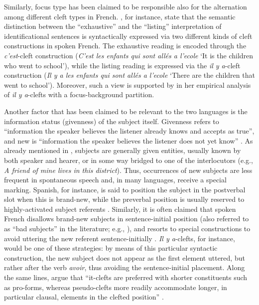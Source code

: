 Similarly, focus type has been claimed to be responsible also for the alternation among different cleft types in French. \textcite{de2015status}, for instance, state that the semantic distinction between the ``exhaustive” and the ``listing” interpretation of identificational sentences is syntactically expressed via two different kinds of cleft constructions in spoken French. The exhaustive reading is encoded through the \textit{c’est}-cleft construction (\textit{C’est les enfants qui sont allés a l’ecole} `It is the children who went to school'), while the listing reading is expressed via the \textit{il y a}-cleft construction (\textit{Il y a les enfants qui sont allés a l’ecole} `There  are  the  children  that went to school'). Moreover, such a view is supported by \textcite{karssenberg2017oiseaux} in her empirical analysis of \textit{il y a}-clefts with a focus-background partition.

Another factor that has been claimed to be relevant to the two languages is the information status (givenness) \parencite{firbas1966non, chafe1970meaning, prince1992zpg} of the subject itself. Givenness refers to “information the speaker believes the listener already knows and accepts as true”, and new is “information the speaker believes the listener does not yet know” \parencite[3]{clark1977}. As already mentioned in , subjects are generally given entities, usually known by both speaker and hearer, or in some way bridged to one of the interlocutors (e.g., \textit{A friend of mine lives in this district}). Thus, occurrences of new subjects are less frequent in spontaneous speech and, in many languages, receive a special marking. Spanish, for instance, is said to position the subject in the postverbal slot when this is brand-new, while the preverbal position is usually reserved to highly-activated subject referents \parencite{gutierrez2013structural}. Similarly, it is often claimed that spoken French disallows brand-new subjects  in sentence-initial position (also referred to as ``bad subjects” in the literature; e.g., \cite{beaver2005bad, Karssenberg+2018}), and resorts to special constructions to avoid uttering the new referent sentence-initially \parencite{lambrecht2010constraints}. \textit{Il y a}-clefts, for instance, would be one of these strategies: by means of this particular syntactic construction, the new subject does not appear as the first element uttered, but rather after the verb \textit{avoir}, thus avoiding the sentence-initial placement.  Along the same lines, \textcite{dufter201614} argue that ``it-clefts are preferred with shorter constituents such as pro-forms,  whereas pseudo-clefts more readily accommodate longer,  in particular clausal, elements in the clefted position” \parencite[24]{dufter201614}.

